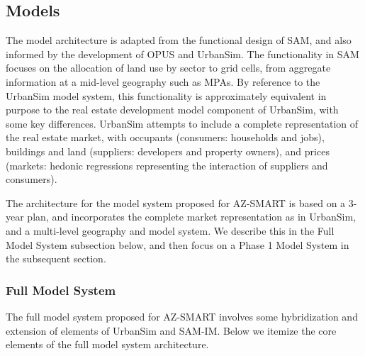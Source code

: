 \subsection{Models}

The model architecture is adapted from the functional design of SAM, and also informed by the development of OPUS and UrbanSim. The functionality in SAM focuses on the allocation of land use by sector to grid cells, from aggregate information at a mid-level geography such as MPAs.  By reference to the UrbanSim model system, this functionality is approximately equivalent in purpose to the real estate development model component of UrbanSim, with some key differences.  UrbanSim attempts to include a complete representation of the real estate market, with occupants (consumers: households and jobs), buildings and land (suppliers: developers and property owners), and prices (markets: hedonic regressions representing the interaction of suppliers and consumers).

The architecture for the model system proposed for AZ-SMART is based on a 3-year plan, and incorporates the complete market representation as in UrbanSim, and a multi-level geography and model system.  We describe this in the Full Model System subsection below, and then focus on a Phase 1 Model System in the subsequent section.

\subsubsection{Full Model System}
The full model system proposed for AZ-SMART involves some hybridization and extension of elements of UrbanSim and SAM-IM. Below we itemize the core elements of the full model system architecture.

